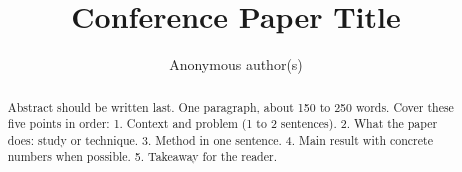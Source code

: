 \documentclass[conference]{IEEEtran}
\begin{document}
\title{Conference Paper Title}


\author{Anonymous author(s)}

\maketitle

\begin{abstract}
Abstract should be written last. 
One paragraph, about 150 to 250 words. Cover these five points in order:
  1. Context and problem (1 to 2 sentences).
  2. What the paper does: study or technique.
  3. Method in one sentence.
  4. Main result with concrete numbers when possible.
  5. Takeaway for the reader.
\end{abstract}
\end{document}
